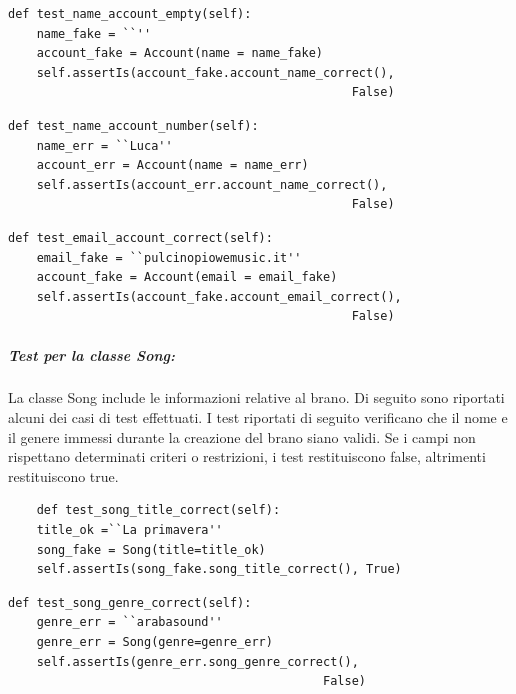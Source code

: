 \vspace{3pt}
\begin{lstlisting}   
def test_name_account_empty(self):
    name_fake = ``''
    account_fake = Account(name = name_fake)
    self.assertIs(account_fake.account_name_correct(), 
                                                False)
\end{lstlisting} 

\vspace{3pt}

\begin{lstlisting}
def test_name_account_number(self):
    name_err = ``Luca''
    account_err = Account(name = name_err)
    self.assertIs(account_err.account_name_correct(), 
                                                False)
\end{lstlisting} 

\vspace{3pt}
\begin{lstlisting}
def test_email_account_correct(self):
    email_fake = ``pulcinopiowemusic.it''
    account_fake = Account(email = email_fake)
    self.assertIs(account_fake.account_email_correct(), 
                                                False)
\end{lstlisting}


\newpage
\vspace{5pt}
\subparagraph{Test per la classe \textbf{Song:}} La classe Song include le informazioni relative al brano. Di seguito sono riportati alcuni dei casi di test effettuati.
I test riportati di seguito verificano che il nome e il genere immessi durante la creazione del brano siano validi. 
Se i campi non rispettano determinati criteri o restrizioni, i test restituiscono false, altrimenti restituiscono true.
\vspace{3pt}

\begin{lstlisting}
    def test_song_title_correct(self):
    title_ok =``La primavera''
    song_fake = Song(title=title_ok)
    self.assertIs(song_fake.song_title_correct(), True)
\end{lstlisting} 
\vspace{3pt}
\begin{lstlisting}
def test_song_genre_correct(self):
    genre_err = ``arabasound''
    genre_err = Song(genre=genre_err)
    self.assertIs(genre_err.song_genre_correct(), 
                                            False)
\end{lstlisting}

